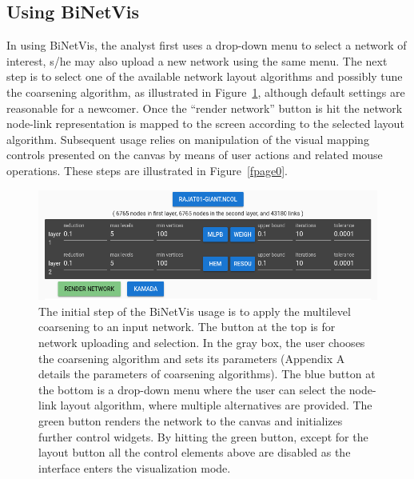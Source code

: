 \documentclass[runningheads]{llncs}
\begin{document}
\subsection{Using BiNetVis}\label{use}
In using BiNetVis, the analyst first uses a drop-down menu to select a network of interest, s/he may also upload a new network using the same menu. The next step is to select one of the available network layout algorithms and possibly tune the coarsening algorithm, as illustrated in Figure~\ref{initial}, although default settings are reasonable for a newcomer.
Once the ``render network'' button is hit the network node-link representation is mapped to the screen according to the selected layout algorithm.
Subsequent usage relies on manipulation of the visual mapping controls presented on the
canvas by means of user actions and related mouse operations.
These steps are illustrated in Figure~\ref{fpage0}.

\begin{figure}\centering
 \includegraphics[width=\textwidth]{initial_}
  \caption{The initial step of the BiNetVis usage is to apply the multilevel coarsening to an input network.
  The button at the top is for network uploading and selection.
  In the gray box, the user chooses the coarsening algorithm and sets its parameters (Appendix A details the parameters of coarsening algorithms). %
  The blue button at the bottom is a drop-down menu where the user can select the node-link layout algorithm, where multiple alternatives are provided.
  The green button renders the network to the canvas and initializes further control widgets.
  By hitting the green button, except for the layout  button all the control elements above are disabled as the interface enters the visualization mode.
  }\label{initial}
\end{figure}
\end{document}
